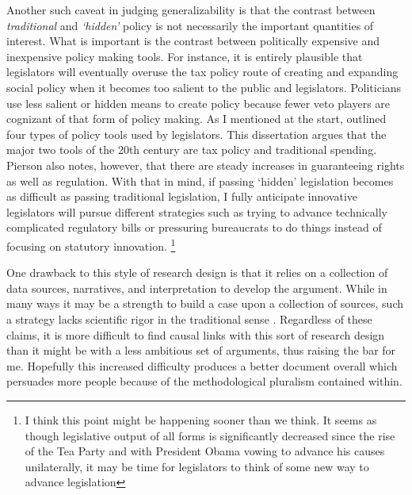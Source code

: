 \documentclass[12pt]{article}
\begin{document}
Another such caveat in judging generalizability is that the contrast between \emph{traditional} and \emph{`hidden'} policy is not necessarily the important quantities of interest. What is important is the contrast between politically expensive and inexpensive policy making tools. For instance, it is entirely plausible that legislators will eventually overuse the tax policy route of creating and expanding social policy when it becomes too salient to the public and legislators. Politicians use less salient or hidden means to create policy because fewer veto players are cognizant of that form of policy making. As I mentioned at the start, \cite{pierson2007} outlined four types of policy tools used by legislators. This dissertation argues that the major two tools of the 20th century are tax policy and traditional spending. Pierson also notes, however, that there are steady increases in guaranteeing rights as well as regulation. With that in mind, if passing `hidden' legislation becomes as difficult as passing traditional legislation, I fully anticipate innovative legislators will pursue different strategies such as trying to advance technically complicated regulatory bills or pressuring bureaucrats to do things instead of focusing on statutory innovation. \footnote{I think this point might be happening sooner than we think. It seems as though legislative output of all forms is significantly decreased since the rise of the Tea Party and with President Obama vowing to advance his causes unilaterally, it may be time for legislators to think of some new way to advance legislation} 

One drawback to this style of research design is that it relies on a collection of data sources, narratives, and interpretation to develop the argument. While in many ways it may be a strength to build a case upon a collection of sources, such a strategy lacks scientific rigor in the traditional sense \citep{king1994}. Regardless of these claims, it is more difficult to find causal links with this sort of research design than it might be with a less ambitious set of arguments, thus raising the bar for me. Hopefully this increased difficulty produces a better document overall which persuades more people because of the methodological pluralism contained within.
\end{document}
